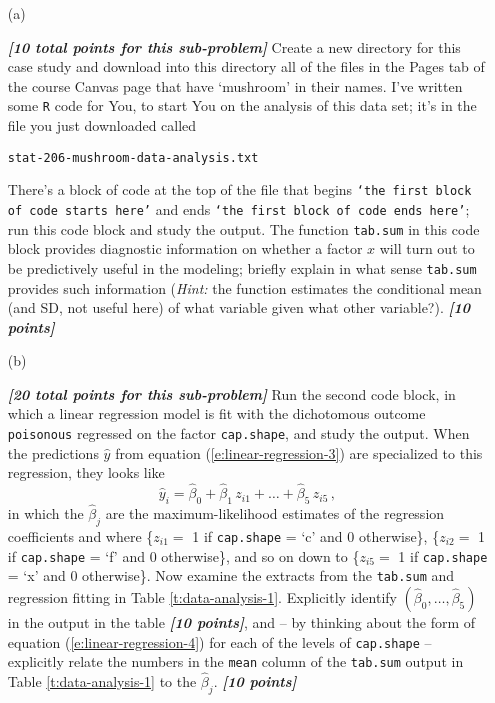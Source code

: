 \documentclass[12pt]{article}
\newcommand{\bi}[1]{\textbf{\textit{#1}}}
\begin{document}
\begin{itemize}

\item[(a)]

\bi{[10 total points for this sub-problem]} Create a new directory for this case study and download into this directory all of the files in the Pages tab of the course Canvas page that have `mushroom' in their names. I've written some \texttt{R} code for You, to start You on the analysis of this data set; it's in the file you just downloaded called

\hspace*{1.0in} \texttt{stat-206-mushroom-data-analysis.txt}

There's a block of code at the top of the file that begins \texttt{`the first block of code starts here'} and ends \texttt{`the first block of code ends here'}; run this code block and study the output. The function \texttt{tab.sum} in this code block provides diagnostic information on whether a factor $x$ will turn out to be predictively useful in the modeling; briefly explain in what sense \texttt{tab.sum} provides such information (\textit{Hint:} the function estimates the conditional mean (and SD, not useful here) of what variable given what other variable?). \bi{[10 points]}

\item[(b)]

\bi{[20 total points for this sub-problem]} Run the second code block, in which a linear regression model is fit with the dichotomous outcome \texttt{poisonous} regressed on the factor \texttt{cap.shape}, and study the output. When the predictions $\hat{ y }$ from equation (\ref{e:linear-regression-3}) are specialized to this regression, they looks like
\begin{equation} \label{e:linear-regression-4}
\hat{ y }_i = \hat{ \beta }_0 + \hat{ \beta }_1 \, z_{ i1 } + \dots + \hat{ \beta }_5 \, z_{ i5 } \, ,
\end{equation} 
in which the $\hat{ \beta }_j$ are the maximum-likelihood estimates of the regression coefficients and where \{$z_{ i1 } =$ 1 if \texttt{cap.shape} = `c' and 0 otherwise\}, \{$z_{ i2 } =$ 1 if \texttt{cap.shape} = `f' and 0 otherwise\}, and so on down to \{$z_{ i5 } =$ 1 if \texttt{cap.shape} = `x' and 0 otherwise\}. Now examine the extracts from the \texttt{tab.sum} and regression fitting in Table \ref{t:data-analysis-1}. Explicitly identify $( \hat{ \beta }_0, \dots, \hat{ \beta }_5 )$ in the output in the table \bi{[10 points]}, and -- by thinking about the form of equation (\ref{e:linear-regression-4}) for each of the levels of \texttt{cap.shape} -- explicitly relate the numbers in the \texttt{mean} column of the \texttt{tab.sum} output in Table \ref{t:data-analysis-1} to the $\hat{ \beta }_j$. \bi{[10 points]}


\end{itemize}
\end{document}
